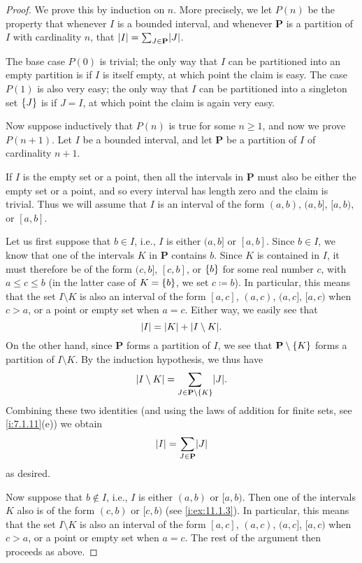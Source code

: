 \begin{proof}
  We prove this by induction on \(n\).
  More precisely, we let \(P(n)\) be the property that whenever \(I\) is a bounded interval, and whenever \(\mathbf{P}\) is a partition of \(I\) with cardinality \(n\), that \(\abs{I} = \sum_{J \in \mathbf{P}} \abs{J}\).

  The base case \(P(0)\) is trivial;
  the only way that \(I\) can be partitioned into an empty partition is if \(I\) is itself empty, at which point the claim is easy.
  The case \(P(1)\) is also very easy;
  the only way that \(I\) can be partitioned into a singleton set \(\left\lbrace J\right\rbrace\) is if \(J = I\), at which point the claim is again very easy.

  Now suppose inductively that \(P(n)\) is true for some \(n \geq 1\), and now we prove \(P(n + 1)\).
  Let \(I\) be a bounded interval, and let \(\mathbf{P}\) be a partition of \(I\) of cardinality \(n + 1\).

  If \(I\) is the empty set or a point, then all the intervals in \(\mathbf{P}\) must also be either the empty set or a point, and so every interval has length zero and the claim is trivial.
  Thus we will assume that \(I\) is an interval of the form \((a, b)\), \((a, b]\), \([a, b)\), or \([a, b]\).

      Let us first suppose that \(b \in I\), i.e., \(I\) is either \((a, b]\) or \([a, b]\).
  Since \(b \in I\), we know that one of the intervals \(K\) in \(\mathbf{P}\) contains \(b\).
  Since \(K\) is contained in \(I\), it must therefore be of the form \((c, b]\), \([c, b]\), or \(\left\lbrace b\right\rbrace\) for some real number \(c\), with \(a \leq c \leq b\) (in the latter case of \(K = \left\lbrace b\right\rbrace\), we set \(c \coloneqq b\)).
  In particular, this means that the set \(I \setminus K\) is also an interval of the form \([a, c]\), \((a, c)\), \((a, c]\), \([a, c)\) when \(c > a\), or a point or empty set when \(a = c\).
  Either way, we easily see that
  \[
    \abs{I} = \abs{K} + \abs{I \setminus K}.
  \]
  On the other hand, since \(\mathbf{P}\) forms a partition of \(I\), we see that \(\mathbf{P} \setminus \left\lbrace K\right\rbrace\) forms a partition of \(I \setminus K\).
  By the induction hypothesis, we thus have
  \[
    \abs{I \setminus K} = \sum_{J \in \mathbf{P} \setminus \set{K}} \abs{J}.
  \]
  Combining these two identities (and using the laws of addition for finite sets, see \cref{i:7.1.11}(e)) we obtain
  \[
    \abs{I} = \sum_{J \in \mathbf{P}} \abs{J}
  \]
  as desired.

  Now suppose that \(b \notin I\), i.e., \(I\) is either \((a, b)\) or \([a, b)\).
  Then one of the intervals \(K\) also is of the form \((c, b)\) or \([c, b)\) (see \cref{i:ex:11.1.3}).
      In particular, this means that the set \(I \setminus K\) is also an interval of the form \([a, c]\), \((a, c)\), \((a, c]\), \([a, c)\) when \(c > a\), or a point or empty set when \(a = c\).
  The rest of the argument then proceeds as above.
\end{proof}

